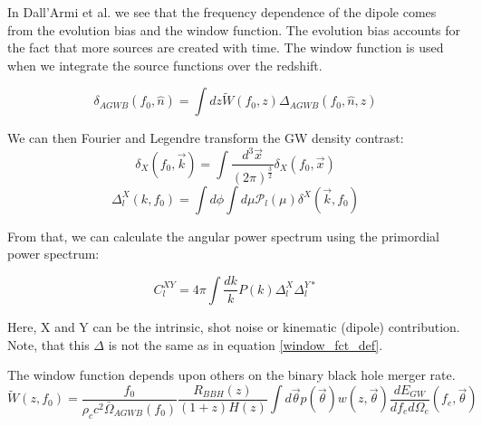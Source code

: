 In Dall'Armi et al. \cite{dallarmi_dipole_2022} we see that the frequency dependence 
of the dipole comes from the evolution bias and the window function. The evolution 
bias accounts for the fact that more sources are created with time. The window 
function is used when we integrate the source functions over the redshift. 

\begin{equation}
\label{window_fct_int}
    \delta_{AGWB}(f_0, \hat{n})=\int dz \tilde{W}(f_0, z)\Delta_{AGWB}(f_0, \hat{n}, z)
\end{equation}


We can then Fourier and Legendre transform the GW density contrast:
\begin{equation}
    \delta_X(f_0, \vec{k}) = \int \frac{d^3\vec{x}}{(2\pi)^\frac{3}{2}} 
    \delta_X(f_0, \vec{x})
\end{equation}
\begin{equation}
    \Delta_l^X(k, f_0) = \int d\phi \int d\mu \mathcal{P}_l(\mu) 
    \delta^X(\vec{k}, f_0)
\end{equation}

From that, we can calculate the angular power spectrum using the primordial power 
spectrum:

\begin{equation}
    C_l^{XY} = 4\pi \int \frac{dk}{k} P(k) \Delta_l^X \Delta_l^{Y*}
\end{equation}

Here, X and Y can be the intrinsic, shot noise or kinematic (dipole) contribution.
Note, that this $\Delta$ is not the same as in equation \ref{window_fct_def}.

The window function depends upon others on the binary black hole merger rate.
\begin{equation}
\label{window}
    \tilde{W}(z, f_0)=\frac{f_0}{\rho_c c^2 \bar{\Omega}_{AGWB}(f_0)}
    \frac{R_{BBH}(z)}{(1+z)H(z)}\int d\vec{\theta}p(\vec{\theta})
    w(z, \vec{\theta}) \frac{dE_{GW}}{df_e d\Omega_e}(f_e, \vec{\theta})
\end{equation}

